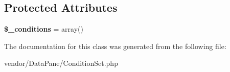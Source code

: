 \subsection*{Protected Attributes}
\begin{DoxyCompactItemize}
\item 
\hypertarget{classConditionSet_a9e267754e1005e82f60216f53cb44067}{
{\bfseries \$\_\-conditions} = array()}
\label{classConditionSet_a9e267754e1005e82f60216f53cb44067}

\end{DoxyCompactItemize}


The documentation for this class was generated from the following file:\begin{DoxyCompactItemize}
\item 
vendor/DataPane/ConditionSet.php\end{DoxyCompactItemize}
